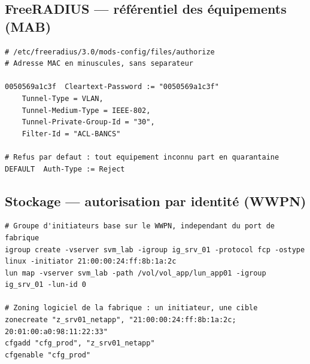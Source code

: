 \documentclass[11pt,a4paper]{article}
\begin{document}
\subsection{FreeRADIUS --- référentiel des équipements (MAB)}
\begin{lstlisting}
# /etc/freeradius/3.0/mods-config/files/authorize
# Adresse MAC en minuscules, sans separateur

0050569a1c3f  Cleartext-Password := "0050569a1c3f"
    Tunnel-Type = VLAN,
    Tunnel-Medium-Type = IEEE-802,
    Tunnel-Private-Group-Id = "30",
    Filter-Id = "ACL-BANCS"

# Refus par defaut : tout equipement inconnu part en quarantaine
DEFAULT  Auth-Type := Reject
\end{lstlisting}

\subsection{Stockage --- autorisation par identité (WWPN)}
\begin{lstlisting}
# Groupe d'initiateurs base sur le WWPN, independant du port de fabrique
igroup create -vserver svm_lab -igroup ig_srv_01 -protocol fcp -ostype linux -initiator 21:00:00:24:ff:8b:1a:2c
lun map -vserver svm_lab -path /vol/vol_app/lun_app01 -igroup ig_srv_01 -lun-id 0

# Zoning logiciel de la fabrique : un initiateur, une cible
zonecreate "z_srv01_netapp", "21:00:00:24:ff:8b:1a:2c; 20:01:00:a0:98:11:22:33"
cfgadd "cfg_prod", "z_srv01_netapp"
cfgenable "cfg_prod"
\end{lstlisting}
\end{document}
